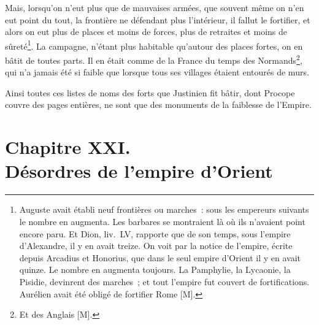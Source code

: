 \documentclass[french,twoside]{book} %
\newcommand\chapteropen{} %
\newcommand\chapterclose{} %
\begin{document}
Mais, lorsqu’on n’eut plus que de mauvaises armées, que souvent même on n’en eut point du tout, la frontière ne défendant plus l’intérieur, il fallut le fortifier, et alors on eut plus de places et moins de forces, plus de retraites et moins de sûreté\footnote{Auguste avait établi neuf frontières ou marches : sous les empereurs suivants le nombre en augmenta. Les barbares se montraient là où ils n’avaient point encore paru. Et Dion, liv. LV, rapporte que de son temps, sous l’empire d’Alexandre, il y en avait treize. On voit par la notice de l’empire, écrite depuis Arcadius et Honorius, que dans le seul empire d’Orient il y en avait quinze. Le nombre en augmenta toujours. La Pamphylie, la Lycaonie, la Pisidie, devinrent des marches ; et tout l’empire fut couvert de fortifications. Aurélien avait été obligé de fortifier Rome [M].}. La campagne, n’étant plus habitable qu’autour des places fortes, on en bâtit de toutes parts. Il en était comme de la France du temps des Normands\footnote{Et des Anglais [M].}, qui n’a jamais été si faible que lorsque tous ses villages étaient entourés de murs.\par
Ainsi toutes ces listes de noms des forts que Justinien fit bâtir, dont Procope couvre des pages entières, ne sont que des monuments de la faiblesse de l’Empire.
\chapterclose


\chapteropen
\chapter[{Chapitre XXI. Désordres de l’empire d’Orient}]{Chapitre XXI. \\
Désordres de l’empire d’Orient}
\label{considérations\_Romains\_chap\_21}\renewcommand{\leftmark}{Chapitre XXI. \\
Désordres de l’empire d’Orient}
\end{document}
